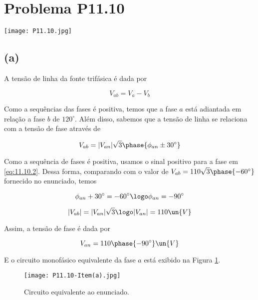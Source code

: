
\section*{Problema P11.10}

\renewcommand*\thesection{11.10}

\begin{center}
    \texttt{[image: P11.10.jpg]}
\end{center}

\subsection*{(a)}

A tensão de linha da fonte trifásica é dada por  

\begin{equation}\label{eq:11.10.1}
    V_{ab} = V_a - V_b
\end{equation}

Como a sequências das fases é positiva, temos que a fase $a$ está adiantada em relação a fase $b$ de $120^{\circ}$.
Além disso, sabemos que a tensão de linha se relaciona com a tensão de fase através de    

\begin{equation}\label{eq:11.10.2}
    V_{ab} = |V_{an}|\sqrt{3}\phase{\phi_{an} \pm 30^{\circ}}
\end{equation}

Como a sequência de fases é positiva, usamos o sinal positivo para a fase em \eqref{eq:11.10.2}. Dessa forma, comparando
com o valor de $V_{ab} = 110\sqrt{3}\phase{-60^{\circ}}$ fornecido no enunciado, temos 

\[ \phi_{an} + 30^{\circ} = -60^{\circ} \logo \phi_{an} = -90^{\circ} \]

\[ |V_{ab}| = |V_{an}|\sqrt{3} \logo |V_{an}| = 110 \un{V} \]

Assim, a tensão de fase é dada por   

\[ V_{an} = 110\phase{-90^{\circ}} \un{V} \]

E o circuito monofásico equivalente da fase $a$ está exibido na Figura \ref*{fig:11.10.1}.

\begin{figure}[hb]
    \centering
    \caption{Circuito equivalente ao enunciado.}
      \centering
      \texttt{[image: P11.10-Item(a).jpg]} \\
    \label{fig:11.10.1}
\end{figure}

